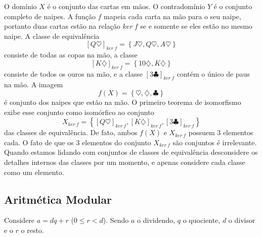          O domínio $X$ é o conjunto das cartas em mãos. O contradomínio $Y$ é o conjunto completo de naipes. A função $f$ mapeia cada carta na mão para o seu naipe, portanto duas cartas estão na relação $ker\ f$ se e somente se eles estão no mesmo naipe. A classe de equivalência $$ \left[Q\heartsuit\right]_{ker\ f} = \left\{J\heartsuit , Q\heartsuit , A\heartsuit \right\}$$ consiste de todas as copas na mão, a classe $$\left[K\diamondsuit \right]_{ker\ f} = \left\{10\diamondsuit , K\diamondsuit \right\}$$ consiste de todos os ouros na mão, e a classe $\left[3\clubsuit \right]_{ker\ f}$ contém o único de paus na mão. A imagem $$f(X) = \left\{\heartsuit , \diamondsuit , \clubsuit  \right\}$$ é conjunto dos naipes que estão na mão. O primeiro teorema de isomorfismo exibe esse conjunto como isomórfico ao conjunto $$X_{ker\ f} = \left\{\left[Q\heartsuit\right]_{ker\ f}, \left[K\diamondsuit\right]_{ker\ f}, \left[3\clubsuit\right]_{ker\ f}\right\}$$ das classes de equivalência. De fato, ambos $f(X)$ e $X_{ker\ f}$ possuem 3 elementos cada. O fato de que os 3 elementos do conjunto $X_{ker\ f}$ são conjuntos é irrelevante. Quando estamos lidando com conjuntos de classes de equivalência desconsidere os detalhes internos das classes por um momento, e apenas considere cada classe como um elemento.

   \subsection{Aritmética Modular}
      Considere $a = dq + r$ ($0 \leq r < d$). Sendo $a$ o dividendo, $q$ o quociente, $d$ o divisor e o $r$ o resto.


